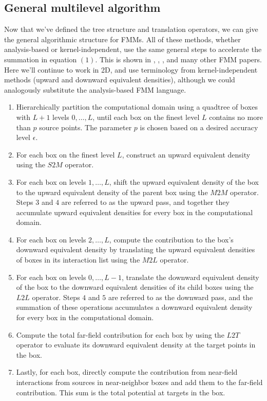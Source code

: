 \documentclass[11pt, oneside]{article}   	%
\begin{document}
\subsection{General multilevel algorithm}
Now that we've defined the tree structure and translation operators, we can give the general algorithmic structure for FMMs. All of these methods, whether analysis-based or kernel-independent, use the same general steps to accelerate the summation in equation $(1)$. This is shown in \cite{FD}, \cite{GR}, \cite{YBZ}, and many other FMM papers. Here we'll continue to work in 2D, and use terminology from kernel-independent methods (upward and downward equivalent densities), although we could analogously substitute the analysis-based FMM language.
\begin{enumerate}
\item Hierarchically partition the computational domain using a quadtree of boxes with $L+1$ levels $0,\dots,L$, until each box on the finest level $L$ contains no more than $p$ source points. The parameter $p$ is chosen based on a desired accuracy level $\epsilon$.
\item For each box on the finest level $L$, construct an upward equivalent density using the $S2M$ operator.
\item For each box on levels $1,\dots,L$, shift the upward equivalent density of the box to the upward equivalent density of the parent box using the $M2M$ operator. Steps $3$ and $4$ are referred to as the upward pass, and together they accumulate upward equivalent densities for every box in the computational domain.
\item For each box on levels $2,\dots,L$, compute the contribution to the box's downward equivalent density by translating the upward equivalent densities of boxes in its interaction list using the $M2L$ operator.
\item For each box on levels $0,\dots,L-1$, translate the downward equivalent density of the box to the downward equivalent densities of its child boxes using the $L2L$ operator. Steps $4$ and $5$ are referred to as the downward pass, and the summation of these operations accumulates a downward equivalent density for every box in the computational domain.
\item Compute the total far-field contribution for each box by using the $L2T$ operator to evaluate its downward equivalent density at the target points in the box.
\item Lastly, for each box, directly compute the contribution from near-field interactions from sources in near-neighbor boxes and add them to the far-field contribution. This sum is the total potential at targets in the box.
\end{enumerate}
\end{document}

